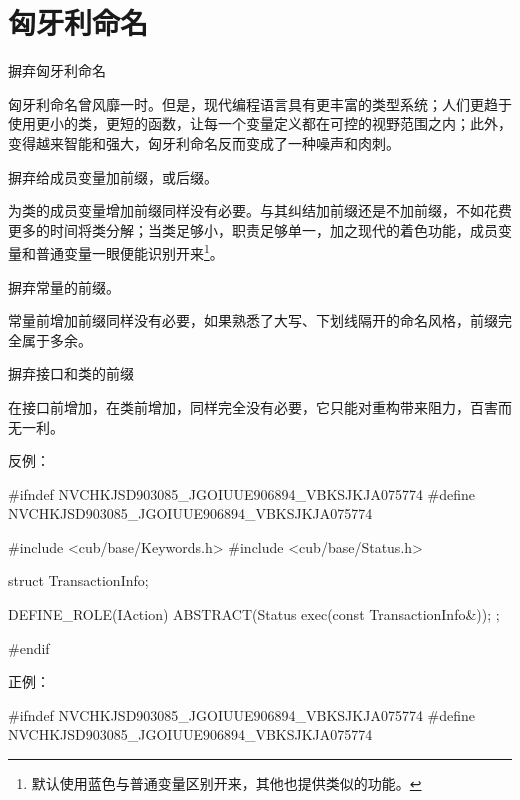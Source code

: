 \section{匈牙利命名}
\begin{content}

\begin{advise}
摒弃匈牙利命名
\end{advise}

匈牙利命名曾风靡一时。但是，现代编程语言具有更丰富的类型系统；人们更趋于使用更小的类，更短的函数，让每一个变量定义都在可控的视野范围之内；此外，变得越来智能和强大，匈牙利命名反而变成了一种噪声和肉刺。

\begin{advise}
摒弃给成员变量加前缀，或后缀。
\end{advise}

为类的成员变量增加前缀同样没有必要。与其纠结加前缀还是不加前缀，不如花费更多的时间将类分解；当类足够小，职责足够单一，加之现代的着色功能，成员变量和普通变量一眼便能识别开来\footnote{默认使用蓝色与普通变量区别开来，其他也提供类似的功能。}。

\begin{advise}
摒弃常量的前缀。
\end{advise}

常量前增加前缀同样没有必要，如果熟悉了大写、下划线隔开的命名风格，前缀完全属于多余。

\begin{advise}
摒弃接口和类的前缀
\end{advise}

在接口前增加，在类前增加，同样完全没有必要，它只能对重构带来阻力，百害而无一利。

反例：
\begin{leftbar}
\begin{c++}[caption={\ttfamily{trans-dsl/sched/IAction.h}}]
#ifndef NVCHKJSD903085_JGOIUUE906894_VBKSJKJA075774
#define NVCHKJSD903085_JGOIUUE906894_VBKSJKJA075774    

#include <cub/base/Keywords.h>
#include <cub/base/Status.h>

struct TransactionInfo;

DEFINE_ROLE(IAction)
{
    ABSTRACT(Status exec(const TransactionInfo&));
};

#endif
\end{c++}
\end{leftbar}

正例：
\begin{leftbar}
\begin{c++}[caption={\ttfamily{trans-dsl/sched/IAction.h}}]
#ifndef NVCHKJSD903085_JGOIUUE906894_VBKSJKJA075774
#define NVCHKJSD903085_JGOIUUE906894_VBKSJKJA075774    


\end{c++}
\end{leftbar}
\end{content}
